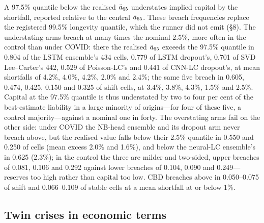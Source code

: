 A 97.5\% quantile below the realised $\ddot{a}_{65}$ understates implied capital by
the shortfall, reported relative to the central $\ddot{a}_{65}$. These breach
frequencies replace the registered 99.5\% longevity quantile, which the runner
did not emit (\S8). The understating arms breach at many times the nominal
2.5\%, more often in the control than under COVID: there the realised
$\ddot{a}_{65}$ exceeds the 97.5\% quantile in 0.804 of the LSTM ensemble's 434
cells, 0.779 of LSTM dropout's, 0.701 of SVD Lee--Carter's 442, 0.529 of
Poisson-LC's and 0.441 of CNN-LC dropout's, at mean shortfalls of 4.2\%, 4.0\%,
4.2\%, 2.0\% and 2.4\%; the same five breach in 0.605, 0.474, 0.425, 0.150 and
0.325 of shift cells, at 3.4\%, 3.8\%, 4.3\%, 1.5\% and 2.5\%. Capital at the
97.5\% quantile is thus understated by two to four per cent of the
best-estimate liability in a large minority of origins---for four of these
five, a control majority---against a nominal one in forty. The overstating arms
fail on the other side: under COVID the NB-head ensemble and its dropout arm
never breach above, but the realised value falls below their 2.5\% quantile in
0.550 and 0.250 of cells (mean excess 2.0\% and 1.6\%), and below the neural-LC
ensemble's in 0.625 (2.3\%); in the control the three are milder and two-sided,
upper breaches of 0.081, 0.106 and 0.292 against lower breaches of 0.104, 0.090
and 0.249---reserves too high rather than capital too low. CBD breaches above
in 0.050--0.075 of shift and 0.066--0.109 of stable cells at a mean shortfall
at or below 1\%.

\subsection{Twin crises in economic terms}

